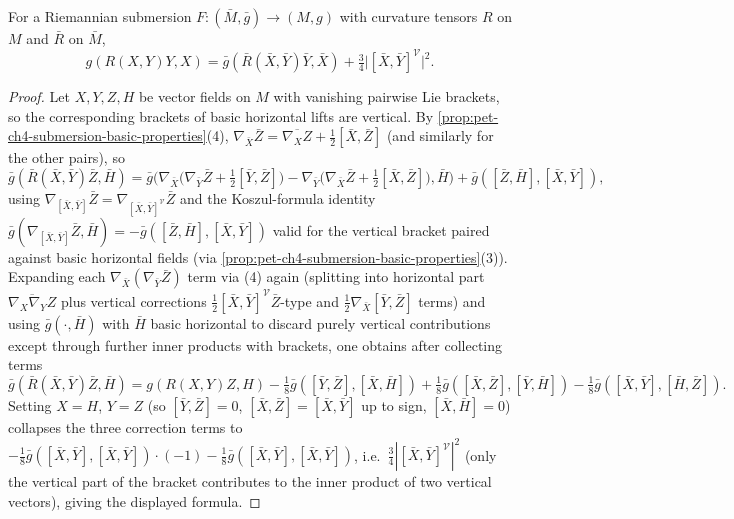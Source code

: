 \begin{theorem}
  \label{thm:pet-ch4-oneill-formula}
  For a Riemannian submersion $F:(\bar M,\bar g)\to(M,g)$ with curvature
  tensors $R$ on $M$ and $\bar R$ on $\bar M$,
  \[
    g(R(X,Y)Y,X)=\bar g(\bar R(\bar X,\bar Y)\bar Y,\bar X)+\tfrac34\big|[\bar X,\bar Y]^{\mathcal V}\big|^2.
  \]
\end{theorem}
\begin{proof}
  Let $X,Y,Z,H$ be vector fields on $M$ with vanishing pairwise Lie brackets,
  so the corresponding brackets of basic horizontal lifts are vertical. By
  \cref{prop:pet-ch4-submersion-basic-properties}(4),
  $\nabla_{\bar X}\bar Z=\overline{\nabla_XZ}+\tfrac12[\bar X,\bar Z]$ (and
  similarly for the other pairs), so
  \[
    \bar g(\bar R(\bar X,\bar Y)\bar Z,\bar H)
    =\bar g\Big(\nabla_{\bar X}\big(\nabla_{\bar Y}\bar Z+\tfrac12[\bar Y,\bar Z]\big)
    -\nabla_{\bar Y}\big(\nabla_{\bar X}\bar Z+\tfrac12[\bar X,\bar Z]\big),\bar H\Big)
    +\bar g([\bar Z,\bar H],[\bar X,\bar Y]),
  \]
  using $\nabla_{[\bar X,\bar Y]}\bar Z=\nabla_{[\bar X,\bar Y]^{\mathcal V}}\bar Z$
  and the Koszul-formula identity
  $\bar g(\nabla_{[\bar X,\bar Y]}\bar Z,\bar H)=-\bar g([\bar Z,\bar H],[\bar X,\bar Y])$
  valid for the vertical bracket paired against basic horizontal fields (via
  \cref{prop:pet-ch4-submersion-basic-properties}(3)). Expanding each
  $\nabla_{\bar X}(\nabla_{\bar Y}\bar Z)$ term via (4) again (splitting into
  horizontal part $\overline{\nabla_X\nabla_YZ}$ plus vertical corrections
  $\tfrac12[\bar X,\bar Y]^{\mathcal V}\bar Z$-type and
  $\tfrac12\nabla_{\bar X}[\bar Y,\bar Z]$ terms) and using $\bar g(\cdot,\bar H)$
  with $\bar H$ basic horizontal to discard purely vertical contributions
  except through further inner products with brackets, one obtains after
  collecting terms
  \[
    \bar g(\bar R(\bar X,\bar Y)\bar Z,\bar H)=g(R(X,Y)Z,H)
    -\tfrac18\bar g([\bar Y,\bar Z],[\bar X,\bar H])+\tfrac18\bar g([\bar X,\bar Z],[\bar Y,\bar H])
    -\tfrac18\bar g([\bar X,\bar Y],[\bar H,\bar Z]).
  \]
  Setting $X=H$, $Y=Z$ (so $[\bar Y,\bar Z]=0$, $[\bar X,\bar Z]=[\bar X,\bar Y]$
  up to sign, $[\bar X,\bar H]=0$) collapses the three correction terms to
  $-\tfrac18\bar g([\bar X,\bar Y],[\bar X,\bar Y])\cdot(-1)-\tfrac18\bar g([\bar X,\bar Y],[\bar X,\bar Y])$,
  i.e.\ $\tfrac34|[\bar X,\bar Y]^{\mathcal V}|^2$ (only the vertical part of the
  bracket contributes to the inner product of two vertical vectors), giving
  the displayed formula.
\end{proof}


